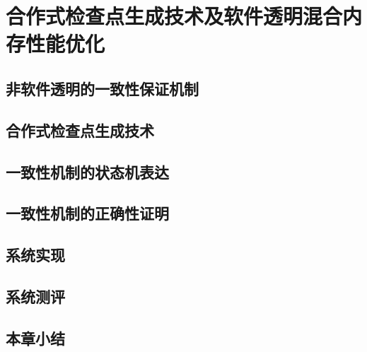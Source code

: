 \chapter{合作式检查点生成技术及软件透明混合内存性能优化}
\label{chap:thnvm}

\section{非软件透明的一致性保证机制}

\section{合作式检查点生成技术}

\section{一致性机制的状态机表达}

\section{一致性机制的正确性证明}

\section{系统实现}

\section{系统测评}

\section{本章小结}

